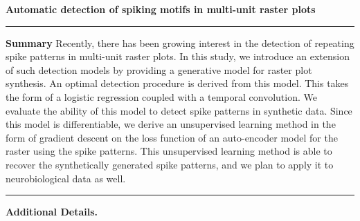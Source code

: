 \documentclass[11pt]{article}
\begin{document}
{\Large\bf 
Automatic detection of spiking motifs in multi-unit raster plots
}

\hrule
\textbf{Summary} %
Recently, there has been growing interest in the detection of repeating spike patterns in multi-unit raster plots. In this study, we introduce an extension of such detection models by providing a generative model for raster plot synthesis. An optimal detection procedure is derived from this model. This takes the form of a logistic regression coupled with a temporal convolution. We evaluate the ability of this model to detect spike patterns in synthetic data. Since this model is differentiable, we derive an unsupervised learning method in the form of gradient descent on the loss function of an auto-encoder model for the raster using the spike patterns. This unsupervised learning method is able to recover the synthetically generated spike patterns, and we plan to apply it to neurobiological data as well.
\vspace{.5cm}
\hrule
\textbf{Additional Details.}%
%
\end{document}
